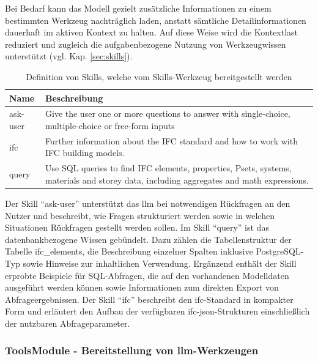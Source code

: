 Bei Bedarf kann das Modell gezielt zusätzliche Informationen zu einem bestimmten Werkzeug nachträglich laden, anstatt sämtliche Detailinformationen dauerhaft im aktiven Kontext zu halten.
Auf diese Weise wird die Kontextlast reduziert und zugleich die aufgabenbezogene Nutzung von Werkzeugwissen unterstützt (vgl. Kap. \ref{sec:skills}).

\begin{table}[!htb]
    \centering
    \caption[Definition von Skills im Skills-Werkzeug]{Definition von Skills, welche vom Skills-Werkzeug bereitgestellt werden}
    \label{tab:103_available-skills}
    \begin{tabular}{C{2cm} L{11cm}}
        \hline
        \textbf{Name} & \textbf{Beschreibung} \\
        \hline

        ask-user & Give the user one or more questions to answer with single-choice, multiple-choice or free-form inputs \\

        ifc & Further information about the IFC standard and how to work with IFC building models. \\

        query & Use SQL queries to find IFC elements, properties, Psets, systems, materials and storey data, including aggregates and math expressions. \\

        \hline
    \end{tabular}
\end{table}

Der Skill \enquote{ask-user} unterstützt das \gls{llm} bei notwendigen Rückfragen an den Nutzer und beschreibt, wie Fragen strukturiert werden sowie in welchen Situationen Rückfragen gestellt werden sollen.
Im Skill \enquote{query} ist das datenbankbezogene Wissen gebündelt.
Dazu zählen die Tabellenstruktur der Tabelle ifc\_elements, die Beschreibung einzelner Spalten inklusive PostgreSQL-Typ sowie Hinweise zur inhaltlichen Verwendung.
Ergänzend enthält der Skill erprobte Beispiele für SQL-Abfragen, die auf den vorhandenen Modelldaten ausgeführt werden können sowie Informationen zum direkten Export von Abfrageergebnissen.
Der Skill \enquote{ifc} beschreibt den \gls{ifc}-Standard in kompakter Form und erläutert den Aufbau der verfügbaren \gls{ifc}-\gls{json}-Strukturen einschließlich der nutzbaren Abfrageparameter.

\subsubsection{ToolsModule - Bereitstellung von \gls{llm}-Werkzeugen}
\label{sec:app-toolsmodule}

